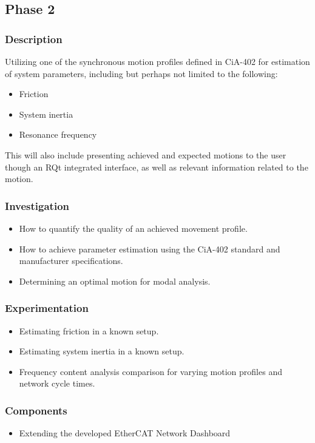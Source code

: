 \subsection{Phase 2}
\subsubsection{Description}

\noindent
Utilizing one of the synchronous motion profiles defined in CiA-402 for estimation of system parameters, including but perhaps not limited to the following:

\vspace{6pt}
\begin{itemize}[nosep]
	\item Friction
	\item System inertia
	\item Resonance frequency
\end{itemize}
\vspace{6pt}

\noindent
This will also include presenting achieved and expected motions to the user though an RQt integrated interface, as well as relevant information related to the motion. 

\subsubsection{Investigation}

\vspace{6pt}
\begin{itemize}[nosep]
	\item How to quantify the quality of an achieved movement profile.
	\item How to achieve parameter estimation using the CiA-402 standard and manufacturer specifications.
	\item Determining an optimal motion for modal analysis. 
\end{itemize}
\vspace{6pt}

\subsubsection{Experimentation}

\vspace{6pt}
\begin{itemize}[nosep]
	\item Estimating friction in a known setup.
	\item Estimating system inertia in a known setup. 
	\item Frequency content analysis comparison for varying motion profiles and network cycle times.
\end{itemize}
\vspace{6pt}

\subsubsection{Components}

\vspace{6pt}
\begin{itemize}[nosep]
	\item Extending the developed EtherCAT Network Dashboard
\end{itemize}
\vspace{6pt}
